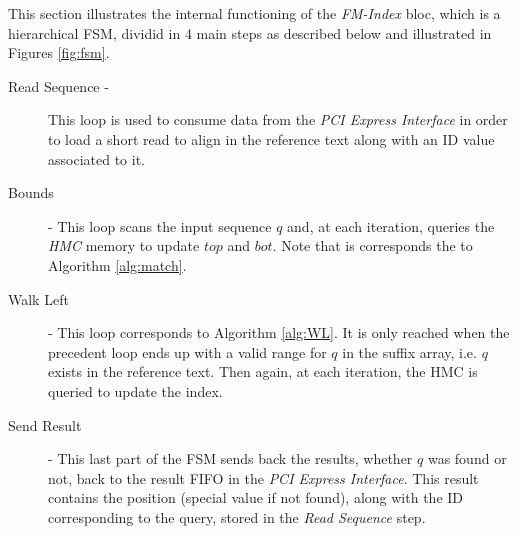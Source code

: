 This section illustrates the internal functioning of the \textsl{FM-Index} bloc, which is a hierarchical FSM, dividid in 4 main steps as described below and illustrated in Figures \ref{fig:fsm}.
\begin{description}
\item [Read Sequence -] This loop is used to consume data from the \textsl{PCI Express Interface} in order to load a short read to align in the reference text along with an ID value associated to it.
\item [Bounds] - This loop scans the input sequence $q$ and, at each iteration, queries the \textsl{HMC} memory to update $top$ and $bot$. Note that is corresponds the to Algorithm \ref{alg:match}.
\item [Walk Left] - This loop corresponds to Algorithm \ref{alg:WL}. It is only reached when the precedent loop ends up with a valid range for $q$ in the suffix array, i.e. $q$ exists in the reference text. Then again, at each iteration, the HMC is queried to update the index.
\item [Send Result] - This last part of the FSM sends back the results, whether $q$ was found or not, back to the result FIFO in the \textsl{PCI Express Interface}. This result contains the position (special value if not found), along with the ID corresponding to the query, stored in the \textsl{Read Sequence} step.
\end{description}
